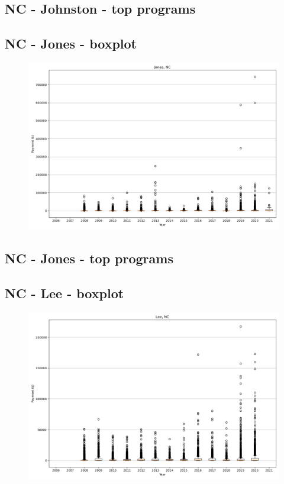 \subsection*{NC - Johnston - top programs}

\newpage
\subsection*{NC - Jones - boxplot}
\begin{figure}[h]
\centering
\includegraphics[width=7in]{../output/boxplots/counties/Jones-NC_boxplot.png}
\end{figure}


\subsection*{NC - Jones - top programs}

\newpage
\subsection*{NC - Lee - boxplot}
\begin{figure}[h]
\centering
\includegraphics[width=7in]{../output/boxplots/counties/Lee-NC_boxplot.png}
\end{figure}


